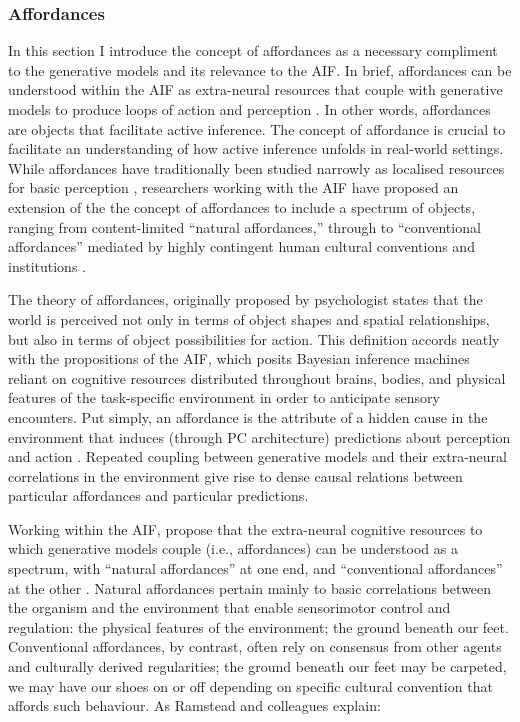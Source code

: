 \begin{CJK}{UTF8}{gbsn}
\subsubsection{Affordances\label{sect:affordances}}
In this section I introduce the concept of affordances as a necessary compliment to the generative models and its relevance to the AIF.  In brief, affordances can be understood within the AIF as extra-neural resources that couple with generative models to produce loops of action and perception \citep{Ramstead2016,Clark2015}.  In other words, affordances are objects that facilitate active inference.  The concept of affordance is crucial to facilitate an understanding of how active inference unfolds in real-world settings. While affordances have traditionally been studied narrowly as localised resources for basic perception \citep[e.g.][]{Fajen2011}, researchers working with the AIF have proposed an extension of the the concept of affordances to include a spectrum of objects, ranging from content-limited ``natural affordances,'' through to ``conventional affordances'' mediated by highly contingent human cultural conventions and institutions  \citep[cf.][]{Roepstorff2010,Ramstead2016}.

The theory of affordances, originally proposed by psychologist \textcite{Gibson1979} states that the world is perceived not only in terms of object shapes and spatial relationships, but also in terms of object possibilities for action.  This definition accords neatly with the propositions of the AIF, which posits Bayesian inference machines reliant on cognitive resources distributed throughout brains, bodies, and physical features of the task-specific environment in order to anticipate sensory encounters.  Put simply, an affordance is the attribute of a hidden cause in the environment that induces (through PC architecture) predictions about perception and action \citep[908]{Pezzulo2013}.  Repeated coupling between generative models and their extra-neural correlations in the environment give rise to dense causal relations between particular affordances and particular predictions.

Working within the AIF, \textcite[7]{Ramstead2016} propose that the extra-neural cognitive resources to which generative models couple (i.e., affordances) can be understood as a spectrum, with ``natural affordances'' at one end, and ``conventional affordances'' at the other \citep{Ramstead2016}.  Natural affordances pertain mainly to basic correlations between the organism and the environment that enable sensorimotor control and regulation: the physical features of the environment; the ground beneath our feet.  Conventional affordances, by contrast, often rely on consensus from other agents and culturally derived regularities; the ground beneath our feet may be carpeted, we may have our shoes on or off depending on specific cultural convention that affords such behaviour.  As Ramstead and colleagues explain:


\end{CJK}
